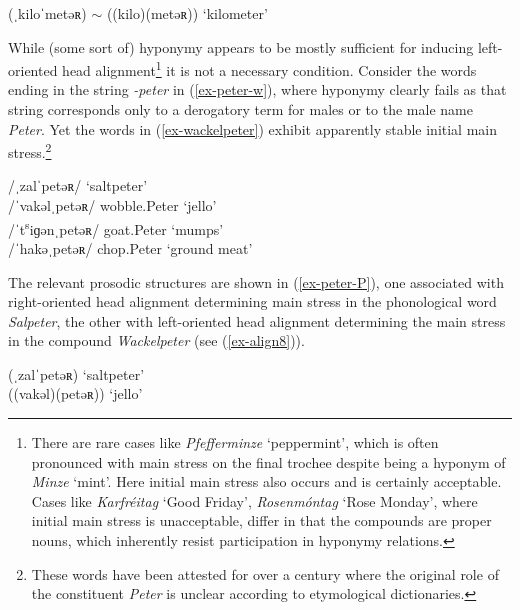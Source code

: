 \documentclass[output=paper
 ,nobabel
 ,draftmode
 ,colorlinks, citecolor=brown
]{langscibook}
\begin{document}
\ex\label{ex-pumpernickel-P}
(ˌkiloˈmetəʀ) $\sim$ ((kilo)(metəʀ))  `kilometer'   \\ 

\zl

\noindent
While (some sort of) hyponymy appears to be mostly sufficient for inducing left-oriented head alignment\footnote{There are rare cases like \emph{Pfefferminze} `peppermint', which is often pronounced with main stress on the final trochee despite being a hyponym of \emph{Minze} `mint'. Here initial main stress also occurs and is certainly acceptable. Cases like \emph{Karfréitag} `Good Friday', \emph{Rosenmóntag} `Rose Monday', where initial main stress is unacceptable, differ in that the compounds are proper nouns, which inherently resist participation in hyponymy relations.} it is not a necessary condition. Consider the words ending in the string \emph{-peter} in (\ref{ex-peter-w}), where hyponymy clearly fails as that string corresponds only to a derogatory term for males or to the male name \emph{Peter}. Yet the words in (\ref{ex-wackelpeter}) exhibit apparently stable initial main stress.\footnote{These words have been attested for over a century where the original role of the constituent \emph{Peter} is unclear according to  etymological dictionaries.}


\eal\label{ex-peter-w}

\ex\label{ex-salpeter}
/ˌzalˈpetəʀ/  `saltpeter'  \\ 

\ex\label{ex-wackelpeter}
/ˈvakəlˌpetəʀ/  wobble.Peter `jello' \\
/ˈt\textsuperscript{s}iɡənˌpetəʀ/  goat.Peter `mumps' \\
/ˈhakəˌpetəʀ/  chop.Peter `ground meat' \\

\zl

\noindent
The relevant prosodic structures are shown in (\ref{ex-peter-P}), one associated with right-oriented
head alignment determining main stress in the phonological word \emph{Salpeter}, the other with
left-oriented head alignment determining the main stress in the compound \emph{Wackelpeter} (see (\ref{ex-align8})).  



\eal\label{ex-peter-P}
\ex\label{ex-salpeter-P}
(ˌzalˈpetəʀ)  `saltpeter'   \\ 
\ex\label{ex-wackelpeter-P} 
((vakəl)(petəʀ))  `jello' \\ 
\end{document}
